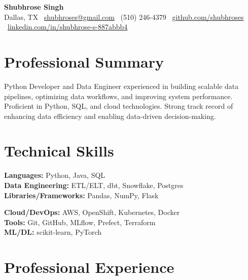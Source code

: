 \documentclass[10pt, letterpaper]{article}
\begin{document}
    \begin{center}
        {\LARGE \textbf{Shubhrose Singh}}\\[3pt]
        Dallas, TX \textbar\ 
        \href{mailto:shubhroses@gmail.com}{shubhroses@gmail.com} \textbar\ 
        (510) 246-4379 \textbar\ 
        \href{https://github.com/shubhroses}{github.com/shubhroses} \textbar\ 
        \href{https://www.linkedin.com/in/shubhrose-s-887abbb4/}{linkedin.com/in/shubhrose-s-887abbb4}
    \end{center}

    \vspace{-0.3cm}

    \section{Professional Summary}
    Python Developer and Data Engineer experienced in building scalable data pipelines, optimizing data workflows, and improving system performance. Proficient in Python, SQL, and cloud technologies. Strong track record of enhancing data efficiency and enabling data-driven decision-making.
    \vspace{-0.05cm}
    \section{Technical Skills}
    \begin{minipage}[t]{0.48\textwidth}
        \textbf{Languages:} Python, Java, SQL \\[-1pt]
        \textbf{Data Engineering:} ETL/ELT, dbt, Snowflake, Postgres \\[-1pt]
        \textbf{Libraries/Frameworks:} Pandas, NumPy, Flask
    \end{minipage}
    \hfill
    \begin{minipage}[t]{0.48\textwidth}
        \textbf{Cloud/DevOps:} AWS, OpenShift, Kubernetes, Docker \\[-1pt]
        \textbf{Tools:} Git, GitHub, MLflow, Prefect, Terraform \\[-1pt]
        \textbf{ML/DL:} scikit-learn, PyTorch
    \end{minipage}
    \vspace{-0.05cm}
    \section{Professional Experience}
\end{document}
